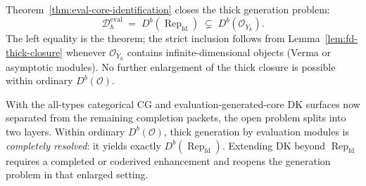 \begin{remark}
\label{rem:corrected-mc3-frontier}
Theorem~\ref{thm:eval-core-identification} closes the thick
generation problem:
\begin{equation}\label{eq:eval-core-sandwich}
\mathcal{D}_\hbar^{\mathrm{eval}}
\;=\; D^b(\operatorname{Rep}_{\mathrm{fd}})
\;\subsetneq\; D^b(\mathcal{O}_{Y_\hbar}).
\end{equation}
The left equality is the theorem; the strict inclusion follows from
Lemma~\ref{lem:fd-thick-closure} whenever $\mathcal{O}_{Y_\hbar}$
contains infinite-dimensional objects (Verma or asymptotic modules).
No further enlargement of the thick closure is possible within
ordinary $D^b(\mathcal{O})$.

With the all-types categorical CG and evaluation-generated-core DK
surfaces now separated from the remaining completion packets, the open
problem splits into two layers.
Within ordinary $D^b(\mathcal{O})$, thick generation by evaluation
modules is \emph{completely resolved}: it yields exactly
$D^b(\operatorname{Rep}_{\mathrm{fd}})$. Extending DK beyond
$\operatorname{Rep}_{\mathrm{fd}}$ requires a completed or coderived
enhancement and reopens the generation problem in that enlarged
setting.


\end{remark}
